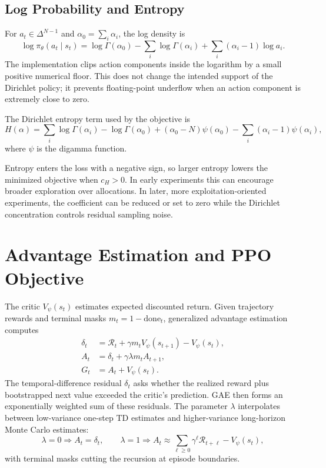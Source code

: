 \documentclass[11pt]{article}
\newcommand{\simplex}{\Delta^{N-1}}
\newcommand{\1}{\mathbf{1}}
\begin{document}
\subsection{Log Probability and Entropy}

For $a_t \in \simplex$ and $\alpha_0=\sum_i\alpha_i$, the log density is
\[
\log \pi_\theta(a_t\mid s_t)
= \log\Gamma(\alpha_0)
- \sum_i \log\Gamma(\alpha_i)
+ \sum_i(\alpha_i-1)\log a_i.
\]
The implementation clips action components inside the logarithm by a small
positive numerical floor. This does not change the intended support of the
Dirichlet policy; it prevents floating-point underflow when an action component
is extremely close to zero.

The Dirichlet entropy term used by the objective is
\[
H(\alpha) =
\sum_i \log\Gamma(\alpha_i)-\log\Gamma(\alpha_0)
+(\alpha_0-N)\psi(\alpha_0)
-\sum_i(\alpha_i-1)\psi(\alpha_i),
\]
where $\psi$ is the digamma function.

Entropy enters the loss with a negative sign, so larger entropy lowers the
minimized objective when $c_H>0$. In early experiments this can encourage
broader exploration over allocations. In later, more exploitation-oriented
experiments, the coefficient can be reduced or set to zero while the Dirichlet
concentration controls residual sampling noise.

\section{Advantage Estimation and PPO Objective}

The critic $V_\psi(s_t)$ estimates expected discounted return. Given trajectory
rewards and terminal masks $m_t=1-\mathrm{done}_t$, generalized advantage
estimation computes
\begin{align}
\delta_t &= \mathcal{R}_t + \gamma m_t V_\psi(s_{t+1}) - V_\psi(s_t),\\
A_t &= \delta_t + \gamma\lambda m_t A_{t+1},\\
G_t &= A_t + V_\psi(s_t).
\end{align}
The temporal-difference residual $\delta_t$ asks whether the realized reward
plus bootstrapped next value exceeded the critic's prediction. GAE then forms
an exponentially weighted sum of these residuals. The parameter $\lambda$
interpolates between low-variance one-step TD estimates and higher-variance
long-horizon Monte Carlo estimates:
\[
\lambda=0 \Rightarrow A_t=\delta_t,
\qquad
\lambda=1 \Rightarrow A_t
\approx
\sum_{\ell\ge0}\gamma^\ell \mathcal{R}_{t+\ell}-V_\psi(s_t),
\]
with terminal masks cutting the recursion at episode boundaries.
\end{document}
